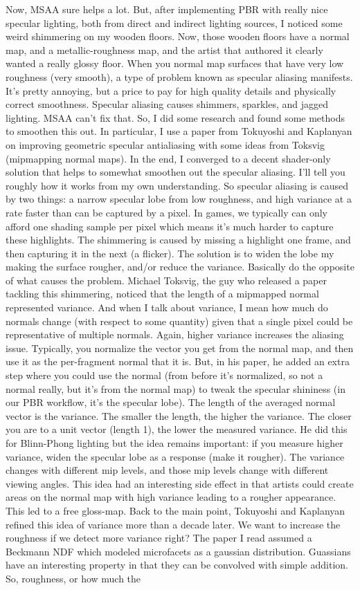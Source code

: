 \documentclass{article}
\begin{document}
Now, MSAA sure helps a lot. But, after implementing PBR with really nice specular lighting, both from direct and indirect lighting sources, I noticed some weird shimmering on my wooden floors. Now, those wooden floors have a normal map, and a metallic-roughness map, and the artist that authored it clearly wanted a really glossy floor. When you normal map surfaces that have very low roughness (very smooth), a type of problem known as specular aliasing manifests. It's pretty annoying, but a price to pay for high quality details and physically correct smoothness. Specular aliasing causes shimmers, sparkles, and jagged lighting. MSAA can't fix that. So, I did some research and found some methods to smoothen this out. In particular, I use a paper from Tokuyoshi and Kaplanyan on improving geometric specular antialiasing with some ideas from Toksvig (mipmapping normal maps). In the end, I converged to a decent shader-only solution that helps to somewhat smoothen out the specular aliasing. I'll tell you roughly how it works from my own understanding. So specular aliasing is caused by two things: a narrow specular lobe from low roughness, and high variance at a rate faster than can be captured by a pixel. In games, we typically can only afford one shading sample per pixel which means it's much harder to capture these highlights.  The shimmering is caused by missing a highlight one frame, and then capturing it in the next (a flicker). The solution is to widen the lobe my making the surface rougher, and/or reduce the variance. Basically do the opposite of what causes the problem. Michael Toksvig, the guy who released a paper tackling this shimmering, noticed that the length of a mipmapped normal represented variance. And when I talk about variance, I mean how much do normals change (with respect to some quantity) given that a single pixel could be representative of multiple normals. Again, higher variance increases the aliasing issue. Typically, you normalize the vector you get from the normal map, and then use it as the per-fragment normal that it is. But, in his paper, he added an extra step where you could use the normal (from before it's normalized, so not a normal really, but it's from the normal map) to tweak the specular shininess (in our PBR workflow, it's the specular lobe). The length of the averaged normal vector is the variance. The smaller the length, the higher the variance. The closer you are to a unit vector (length 1), the lower the measured variance. He did this for Blinn-Phong lighting but the idea remains important: if you measure higher variance, widen the specular lobe as a response (make it rougher). The variance changes with different mip levels, and those mip levels change with different viewing angles. This idea had an interesting side effect in that artists could create areas on the normal map with high variance leading to a rougher appearance. This led to a free gloss-map. Back to the main point, Tokuyoshi and Kaplanyan refined this idea of variance more than a decade later. We want to increase the roughness if we detect more variance right? The paper I read assumed a Beckmann NDF which modeled microfacets as a gaussian distribution. Guassians have an interesting property in that they can be convolved with simple addition. So, roughness, or how much the 
\end{document}
